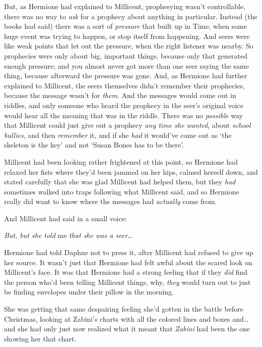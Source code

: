 But, as Hermione had explained to Millicent, prophesying wasn't controllable, 
there was no way to \emph{ask} for a prophecy about anything in particular. 
Instead (the books had said) there was a sort of \emph{pressure} that built up 
in Time, when some huge event was trying to happen, or stop itself from 
happening. And seers were like weak points that let out the pressure, when the 
right listener was nearby. So prophecies were only about big, important things, 
because only that generated enough pressure; and you almost never got more than 
one seer saying the same thing, because afterward the pressure was gone. And, 
as Hermione had further explained to Millicent, the seers themselves didn't 
remember their prophecies, because the message wasn't for \emph{them}. And the 
messages would come out in riddles, and only someone who heard the prophecy in 
the seer's original voice would hear all the meaning that was in the riddle. 
There was no \emph{possible} way that Millicent could just give out a prophecy 
\emph{any time she wanted}, about \emph{school bullies}, and then 
\emph{remember} it, and if she \emph{had} it would've come out as `the skeleton 
is the key' and not `Susan Bones has to be there'.

Millicent had been looking rather frightened at this point, so Hermione had 
relaxed her fists where they'd been jammed on her hips, calmed herself down, 
and stated carefully that she was glad Millicent had helped them, but they 
\emph{had} sometimes walked into traps following what Millicent said, and so 
Hermione really did want to know where the messages had \emph{actually} come 
from.

And Millicent had said in a small voice:

\emph{But, but she told} me \emph{that she was a seer{\ldots}}

Hermione had told Daphne not to press it, after Millicent had refused to give 
up her source. It wasn't just that Hermione had felt awful about the scared 
look on Millicent's face. It was that Hermione had a strong feeling that if 
they \emph{did} find the person who'd been telling Millicent things, why, 
\emph{they} would turn out to just be finding envelopes under their pillow in 
the morning.

She was getting that same despairing feeling she'd gotten in the battle before 
Christmas, looking at Zabini's charts with all the colored lines and boxes 
and{\ldots} and she had only just now realized what it meant that \emph{Zabini} 
had been the one showing her that chart.

